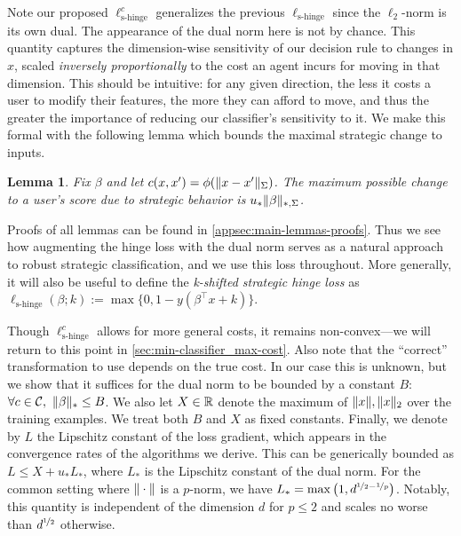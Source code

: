 \documentclass{article}
\newcommand{\costmatrix}{\Sigma}
\newcommand{\costset}{\gC}
\newcommand{\costfunc}{c}
\newcommand{\shingeloss}{\ell_{\textrm{s-hinge}}}
\newcommand{\uinv}{\ensuremath{u_{*}}}
\newcommand{\dualnorm}[1]{\|#1\|_{*}}
\newcommand{\psdnorm}[2]{\matrixnorm{#1}{#2}}
\newcommand{\dualpsdnorm}[2]{\psdnorm{#1}{*,#2}}
\newcommand{\cinc}{{\costfunc\in\costset}}
\newtheorem{lemma}[theorem]{Lemma}
\theoremstyle{definition}
\begin{document}
Note our proposed $\shingeloss^c$ generalizes the previous $\shingeloss$ since the $\ell_2$-norm is its own dual. The appearance of the dual norm here is not by chance. This quantity captures the dimension-wise sensitivity of our decision rule to changes in $x$, scaled \textit{inversely proportionally} to the cost an agent incurs for moving in that dimension. This should be intuitive: for any given direction, the less it costs a user to modify their features, the more they can afford to move, and thus the greater the importance of reducing our classifier's sensitivity to it. We make this formal with the following lemma
which bounds the maximal strategic change to inputs.
\begin{lemma}
    \label{lemma:dualnorm-soln}
    Fix $\beta$ and let $c(x, x') = \phi(\psdnorm{x-x'}{\costmatrix})$. The maximum possible change to a user's score 
    due to
    strategic behavior is
    $\uinv \dualpsdnorm{\beta}{\costmatrix}$.
\end{lemma}

Proofs of all lemmas can be found in \cref{appsec:main-lemmas-proofs}. Thus we see how augmenting the hinge loss with the dual norm serves as a natural approach to robust strategic classification, and we use this loss throughout. More generally, it will also be useful to define the \emph{k-shifted strategic hinge loss} as $\shingeloss(\beta; k) := \max\{0, 1 - y(\beta^\top x + k)\}$.

Though $\shingeloss^c$ allows for more general costs, it remains non-convex---we will return to this point in \cref{sec:min-classifier_max-cost}.
Also note that the ``correct'' transformation to use depends on the true cost. In our case this is unknown, but we show that it suffices for the dual norm to be bounded by a constant $B$:
$\forall \cinc,\ \dualnorm{\beta} \leq B$. We also let $X\in\mathbb{R}$ denote the maximum of $\| x \|, \| x \|_2$ over the training examples. We treat both $B$ and $X$ as fixed constants. Finally, we denote by $L$ the Lipschitz constant of the loss gradient, which appears in the convergence rates of the algorithms we derive. This can be generically bounded as $L \leq X + \uinv L_*$, where $L_*$ is the Lipschitz constant of the dual norm. For the common setting where $\| \cdot \|$ is a $p$-norm, we have $L_* = \max\left(1, d^{\nicefrac{1}{2} - \nicefrac{1}{p}}\right)$. Notably, this quantity is independent of the dimension $d$ for $p \leq 2$ and scales no worse than $d^{\nicefrac{1}{2}}$ otherwise.
\end{document}

